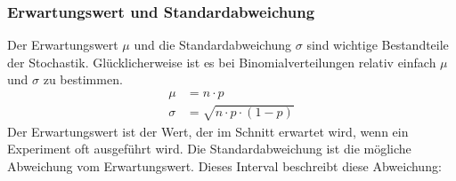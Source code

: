 \subsubsection{Erwartungswert und Standardabweichung}
\begin{flushleft}
    Der Erwartungswert $\mu$ und die Standardabweichung $\sigma$ sind wichtige Bestandteile der Stochastik.
    Glücklicherweise ist es bei Binomialverteilungen relativ einfach $\mu$ und $\sigma$ zu bestimmen.
    \begin{align}
        \mu &= n \cdot p \\
        \sigma &= \sqrt{n \cdot p \cdot (1-p)}
    \end{align}
    Der Erwartungswert ist der Wert, der im Schnitt erwartet wird, wenn ein Experiment oft ausgeführt wird.
    Die Standardabweichung ist die mögliche Abweichung vom Erwartungswert.
    Dieses Interval beschreibt diese Abweichung:
    \begin{align}
        [\mu-\sigma;\mu+\sigma]
    \end{align}
\end{flushleft}
